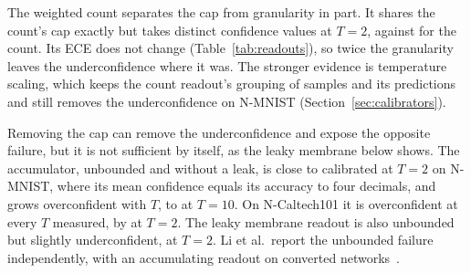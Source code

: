 \documentclass[10pt]{article}
\begin{document}
The weighted count separates the cap from granularity in part. It shares the count's cap exactly but
takes \roWcLevels{} distinct confidence values at $T=2$, against \roCountLevels{} for the count. %
Its ECE does not change (Table~\ref{tab:readouts}), so twice the granularity leaves the %
underconfidence where it was. The stronger evidence is temperature scaling, which keeps the count
readout's grouping of samples and its predictions and still removes the underconfidence on N-MNIST
(Section~\ref{sec:calibrators}).

Removing the cap can remove the underconfidence and expose the opposite failure, but it is not
sufficient by itself, as the leaky membrane below shows. The accumulator,
unbounded and without a leak, is close to calibrated at $T=2$ on N-MNIST, where its mean confidence %
equals its accuracy to four decimals, and
grows overconfident with $T$, to \roAccConfAccTen{} at $T=10$. On N-Caltech101 it is %
overconfident at every $T$ measured, by \ncAccTwoConfAcc{} at $T=2$. The leaky membrane readout %
is also unbounded but slightly underconfident, \roMemConfAcc{} at $T=2$. Li et al.\ report the %
unbounded failure independently, with an accumulating readout on converted
networks~\citep{li2023dynamic}. %
\end{document}
